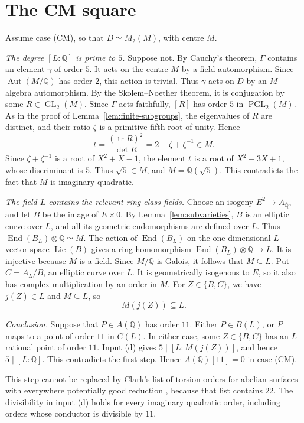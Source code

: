 \documentclass[11pt]{article}
\theoremstyle{remark}
\newcommand{\Q}{\mathbb Q}
\DeclareMathOperator{\End}{End}
\DeclareMathOperator{\GL}{GL}
\DeclareMathOperator{\PGL}{PGL}
\DeclareMathOperator{\Aut}{Aut}
\DeclareMathOperator{\Lie}{Lie}
\begin{document}
\section{The CM square}\label{sec:cm}

Assume case (CM), so that \(D\simeq M_2(M)\), with centre \(M\).

\emph{The degree \([L:\Q]\) is prime to \(5\).} Suppose not. By
Cauchy's theorem, \(\Gamma\) contains an element \(\gamma\) of order
\(5\). It acts on the centre \(M\) by a field automorphism. Since
\(\Aut(M/\Q)\) has order \(2\), this action is trivial. Thus
\(\gamma\) acts on \(D\) by an \(M\)-algebra automorphism. By the
Skolem--Noether theorem, it is conjugation by some
\(R\in\GL_2(M)\). Since \(\Gamma\) acts faithfully, \([R]\) has order
\(5\) in \(\PGL_2(M)\). As in the proof of
Lemma~\ref{lem:finite-subgroups}, the eigenvalues of \(R\) are distinct,
and their ratio \(\zeta\) is a primitive fifth root of unity. Hence
\[
 t=\frac{(\operatorname{tr}R)^2}{\det R}=2+\zeta+\zeta^{-1}\in M.
\]
Since \(\zeta+\zeta^{-1}\) is a root of \(X^2+X-1\), the element \(t\)
is a root of \(X^2-3X+1\), whose discriminant is \(5\). Thus
\(\sqrt5\in M\), and \(M=\Q(\sqrt5)\). This contradicts the fact that
\(M\) is imaginary quadratic.

\emph{The field \(L\) contains the relevant ring class fields.} Choose
an isogeny \(E^2\to A_{\overline{\Q}}\), and let \(B\) be the image of
\(E\times0\). By Lemma~\ref{lem:subvarieties}, \(B\) is an elliptic
curve over \(L\), and all its geometric endomorphisms are defined over
\(L\). Thus \(\End(B_L)\otimes\Q\simeq M\). The action of
\(\End(B_L)\) on the one-dimensional \(L\)-vector space \(\Lie(B)\)
gives a ring homomorphism \(\End(B_L)\otimes\Q\to L\). It is injective
because \(M\) is a field. Since \(M/\Q\) is Galois, it follows that
\(M\subseteq L\). Put \(C=A_L/B\), an elliptic curve over \(L\). It is
geometrically isogenous to \(E\), so it also has complex
multiplication by an order in \(M\). For \(Z\in\{B,C\}\), we have
\(j(Z)\in L\) and \(M\subseteq L\), so
\[
 M(j(Z))\subseteq L.
\]

\emph{Conclusion.} Suppose that \(P\in A(\Q)\) has order \(11\). Either
\(P\in B(L)\), or \(P\) maps to a point of order \(11\) in \(C(L)\). In
either case, some \(Z\in\{B,C\}\) has an \(L\)-rational point of order
\(11\). Input (d) gives \(5\mid[L:M(j(Z))]\), and hence
\(5\mid[L:\Q]\). This contradicts the first step. Hence
\(A(\Q)[11]=0\) in case (CM).

This step cannot be replaced by Clark's list of torsion orders for
abelian surfaces with everywhere potentially good reduction
\cite[Theorem~5]{Clark}, because that list contains \(22\). The divisibility in input (d) holds for
every imaginary quadratic order, including orders whose conductor is
divisible by \(11\).
\end{document}
